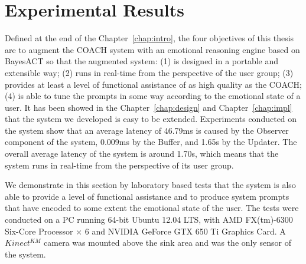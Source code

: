 \chapter{Experimental Results}
\label{chap:result}

Defined at the end of the Chapter~\ref{chap:intro}, the four objectives of this thesis are to augment the COACH system with an emotional reasoning engine based on BayesACT so that the augmented system: (1) is designed in a portable and extensible way; (2) runs in real-time from the perspective of the user group; (3) provides at least a level of functional assistance of as high quality as the COACH; (4) is able to tune the prompts in some way according to the emotional state of a user. It has been showed in the Chapter~\ref{chap:design} and Chapter~\ref{chap:impl} that the system we developed is easy to be extended. Experiments conducted on the system show that an average latency of 46.79ms is caused by the Observer component of the system, 0.009ms by the Buffer, and 1.65s by the Updater. The overall average latency of the system is around 1.70s, which means that the system runs in real-time from the perspective of its user group. 

We demonstrate in this section by laboratory based tests that the system is also able to provide a level of functional assistance and to produce system prompts that have encoded to some extent the emotional state of the user. The tests were conducted on a PC running 64-bit Ubuntu 12.04 LTS, with AMD FX(tm)-6300 Six-Core Processor × 6 and NVIDIA GeForce GTX 650 Ti Graphics Card. A $Kinect^{KM}$ camera was mounted above the sink area and was the only sensor of the system.

